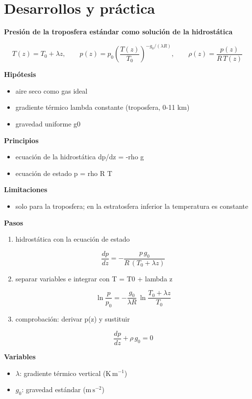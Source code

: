 \documentclass[10pt,openany]{book}
\begin{document}
\section{Desarrollos y práctica}

\begin{tcolorbox}[title={Desarrollos del modelo}, studiumdef, breakable]

\noindent\textbf{Presión de la troposfera estándar como solución de la hidrostática}

\[
T(z) = T_0 + \lambda z,\qquad p(z) = p_0\left(\frac{T(z)}{T_0}\right)^{-g_0/(\lambda R)},\qquad \rho(z) = \frac{p(z)}{R\,T(z)}
\]

\noindent\textbf{Hipótesis}
\begin{itemize}
\item aire seco como gas ideal
\item gradiente térmico lambda constante (troposfera, 0-11 km)
\item gravedad uniforme g0
\end{itemize}

\noindent\textbf{Principios}
\begin{itemize}
\item ecuación de la hidrostática dp/dz = -rho g
\item ecuación de estado p = rho R T
\end{itemize}

\noindent\textbf{Limitaciones}
\begin{itemize}
\item solo para la troposfera; en la estratosfera inferior la temperatura es constante
\end{itemize}

\noindent\textbf{Pasos}
\begin{enumerate}
\item
hidrostática con la ecuación de estado

\[
\frac{dp}{dz} = -\frac{p\,g_0}{R\,(T_0 + \lambda z)}
\]
\item
separar variables e integrar con T = T0 + lambda z

\[
\ln\frac{p}{p_0} = -\frac{g_0}{\lambda R}\,\ln\frac{T_0 + \lambda z}{T_0}
\]
\item
comprobación: derivar p(z) y sustituir

\[
\frac{dp}{dz} + \rho\,g_0 = 0
\]
\end{enumerate}

\noindent\textbf{Variables}
\begin{itemize}
\item $\lambda$: gradiente térmico vertical ($\mathrm{K}\,\mathrm{m}^{-1}$)
\item $g_{0}$: gravedad estándar ($\mathrm{m}\,\mathrm{s}^{-2}$)
\end{itemize}


\end{tcolorbox}
\end{document}
